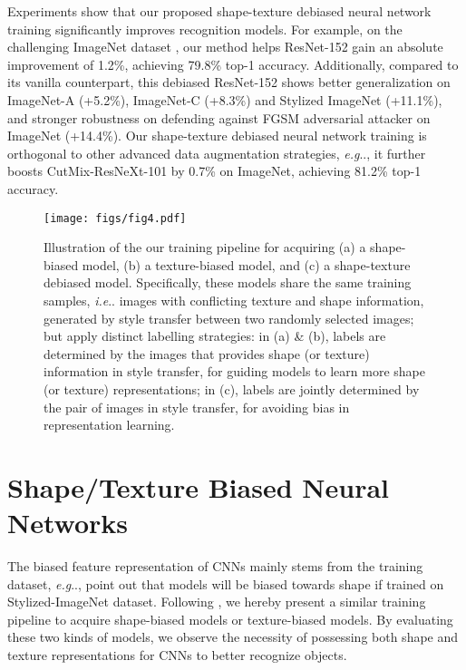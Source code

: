 \documentclass{article} \usepackage{iclr2021_conference,times}
\makeatletter
\DeclareRobustCommand\onedot{\futurelet\@let@token\@onedot}
\def\@onedot{\ifx\@let@token.\else.\null\fi\xspace}
\def\eg{\emph{e.g}\onedot} \def\Eg{\emph{E.g}\onedot}
\def\ie{\emph{i.e}\onedot} \def\Ie{\emph{I.e}\onedot}
\makeatother
\begin{document}
Experiments show that our proposed shape-texture debiased neural network training significantly improves recognition models. For example, on the challenging ImageNet dataset \citep{ILSVRC15}, our method helps ResNet-152 gain an absolute improvement of 1.2\%, achieving 79.8\% top-1 accuracy. Additionally, compared to its vanilla counterpart,  this debiased ResNet-152 shows better generalization on ImageNet-A \citep{hendrycks2019nae} (+5.2\%), ImageNet-C \citep{hendrycks2018benchmarking} (+8.3\%) and Stylized ImageNet \citep{geirhos2018imagenettrained} (+11.1\%), and stronger robustness on defending against FGSM adversarial attacker on ImageNet (+14.4\%). Our shape-texture debiased neural network training is orthogonal to other advanced data augmentation strategies, \eg, it further boosts CutMix-ResNeXt-101 \citep{yun2019cutmix} by 0.7\% on ImageNet, achieving 81.2\% top-1 accuracy.


\begin{figure}[t]
    \centering
    \texttt{[image: figs/fig4.pdf]}
    \vspace{-2em}
    \caption{Illustration of the our training pipeline for acquiring (a) a \textcolor{shapecolor}{shape}-biased model, (b) a \textcolor{texturecolor}{texture}-biased model, and (c) a shape-texture debiased model. Specifically, these models share the same training samples, \ie images with conflicting texture and shape information, generated by style transfer between two randomly selected images; but apply  
    distinct labelling strategies: in (a) \& (b), labels are determined by the images that provides \textcolor{shapecolor}{shape} (or \textcolor{texturecolor}{texture}) information in style transfer, for guiding models to learn more \textcolor{shapecolor}{shape} (or \textcolor{texturecolor}{texture}) representations; in (c), labels are jointly determined by the pair of images in style transfer, for avoiding bias in representation learning.}
    \label{fig:train_models}
    \vspace{-1em}
\end{figure}

\section{Shape/Texture Biased Neural Networks} \label{sec:biased}

The biased feature representation of CNNs mainly stems from the training dataset, \eg, \citet{geirhos2018imagenettrained} point out that models will be biased towards shape if trained on Stylized-ImageNet dataset.
Following \citet{geirhos2018imagenettrained}, we hereby present a similar training pipeline to acquire shape-biased models or texture-biased models. By evaluating these two kinds of models, we observe the necessity of possessing both shape and texture representations for CNNs to better recognize objects.
\end{document}
